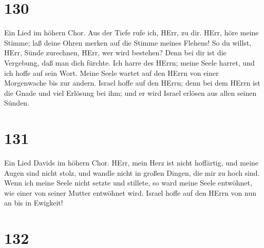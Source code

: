 \hypertarget{section-129}{%
\section{130}\label{section-129}}

 Ein Lied im höhern Chor. Aus der Tiefe rufe ich, HErr, zu
dir.  HErr, höre meine Stimme; laß deine Ohren merken auf
die Stimme meines Flehens!  So du willst, HErr, Sünde
zurechnen, HErr, wer wird bestehen?  Denn bei dir ist die
Vergebung, daß man dich fürchte.  Ich harre des HErrn; meine
Seele harret, und ich hoffe auf sein Wort.  Meine Seele
wartet auf den HErrn von einer Morgenwache bis zur andern. 
Israel hoffe auf den HErrn; denn bei dem HErrn ist die Gnade und viel
Erlösung bei ihm;  und er wird Israel erlösen aus allen
seinen Sünden.

\hypertarget{section-130}{%
\section{131}\label{section-130}}

 Ein Lied Davids im höhern Chor. HErr, mein Herz ist nicht
hoffärtig, und meine Augen sind nicht stolz, und wandle nicht in großen
Dingen, die mir zu hoch sind.  Wenn ich meine Seele nicht
setzte und stillete, so ward meine Seele entwöhnet, wie einer von seiner
Mutter entwöhnet wird.  Israel hoffe auf den HErrn von nun
an bis in Ewigkeit!

\hypertarget{section-131}{%
\section{132}\label{section-131}}

